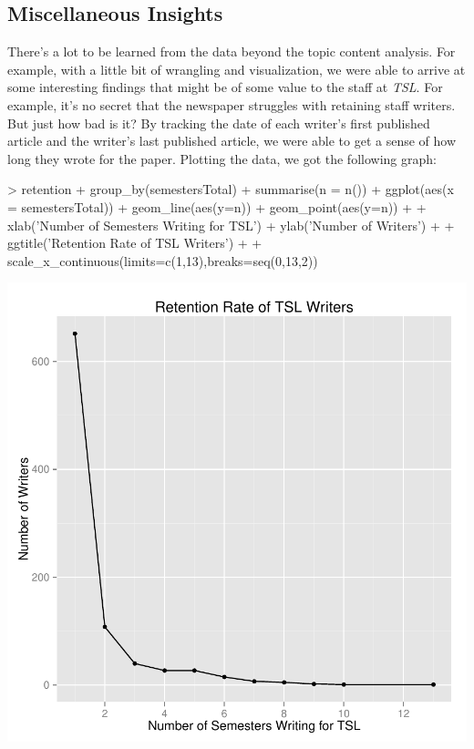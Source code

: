 \documentclass[a4paper]{article}
\begin{document}
\subsection{Miscellaneous Insights}


There's a lot to be learned from the data beyond the topic content analysis. For example, with a little bit of wrangling and visualization, we were able to arrive at some interesting findings that might be of some value to the staff at \textit{TSL}. For example, it's no secret that the newspaper struggles with retaining staff writers. But just how bad is it? By tracking the date of each writer's first published article and the writer's last published article, we were able to get a sense of how long they wrote for the paper. Plotting the data, we got the following graph:


\begin{Schunk}
\begin{Sinput}
> retention %
+   group_by(semestersTotal) %
+   summarise(n = n()) %
+   ggplot(aes(x = semestersTotal)) + geom_line(aes(y=n)) + geom_point(aes(y=n)) +
+   xlab('Number of Semesters Writing for TSL') + ylab('Number of Writers') +
+   ggtitle('Retention Rate of TSL Writers') +
+   scale_x_continuous(limits=c(1,13),breaks=seq(0,13,2))
\end{Sinput}
\end{Schunk}
\includegraphics{FinalProject-015}
\end{document}

